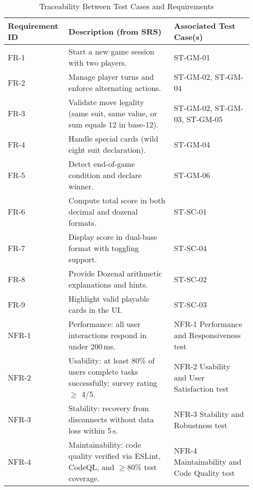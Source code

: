 \documentclass[12pt, titlepage]{article}
\begin{document}
\begin{table}[H]
    \centering
    \caption{Traceability Between Test Cases and Requirements}
    \label{TblTraceability}
    \begin{tabular}{|p{}|p{}|p{}|}
        \hline
        \textbf{Requirement ID} & \textbf{Description (from SRS)} & \textbf{Associated Test Case(s)} \\ \hline

        FR-1 & Start a new game session with two players. & ST-GM-01 \\ \hline
        FR-2 & Manage player turns and enforce alternating actions. & ST-GM-02, ST-GM-04 \\ \hline
        FR-3 & Validate move legality (same suit, same value, or sum equals 12 in base-12). & ST-GM-02, ST-GM-03, ST-GM-05 \\ \hline
        FR-4 & Handle special cards (wild eight suit declaration). & ST-GM-04 \\ \hline
        FR-5 & Detect end-of-game condition and declare winner. & ST-GM-06 \\ \hline
        FR-6 & Compute total score in both decimal and dozenal formats. & ST-SC-01 \\ \hline
        FR-7 & Display score in dual-base format with toggling support. & ST-SC-04 \\ \hline
        FR-8 & Provide Dozenal arithmetic explanations and hints. & ST-SC-02 \\ \hline
        FR-9 & Highlight valid playable cards in the UI. & ST-SC-03 \\ \hline

        NFR-1 & Performance: all user interactions respond in under 200\,ms. & NFR-1 Performance and Responsiveness test \\ \hline
        NFR-2 & Usability: at least 80\% of users complete tasks successfully; survey rating $\geq$ 4/5. & NFR-2 Usability and User Satisfaction test \\ \hline
        NFR-3 & Stability: recovery from disconnects without data loss within 5\,s. & NFR-3 Stability and Robustness test \\ \hline
        NFR-4 & Maintainability: code quality verified via ESLint, CodeQL, and $\geq$80\% test coverage. & NFR-4 Maintainability and Code Quality test \\ \hline

    \end{tabular}
\end{table}
\end{document}

